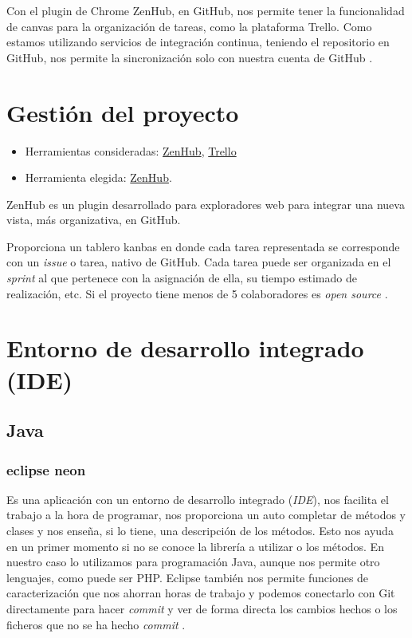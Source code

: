 Con el plugin de Chrome ZenHub, en GitHub, nos permite tener la funcionalidad de canvas para la organización de tareas, como la plataforma Trello. Como estamos utilizando servicios de integración continua, teniendo el repositorio en GitHub, nos permite la sincronización solo con nuestra cuenta de GitHub \cite{web:github}.

\section{Gestión del proyecto}\label{gestion-del-proyecto}

\begin{itemize}
	\tightlist
	\item
	Herramientas consideradas: \href{https://www.zenhub.com/}{ZenHub},
	\href{https://trello.com/}{Trello}
	\item
	Herramienta elegida: \href{https://www.zenhub.com/}{ZenHub}.
\end{itemize}

ZenHub es un plugin desarrollado para exploradores web para integrar una nueva vista, más organizativa, en GitHub. 

Proporciona un tablero kanbas en donde cada tarea representada se corresponde con un \emph{issue} o tarea, nativo de GitHub. Cada tarea puede ser organizada en el \emph{sprint} al que pertenece con la asignación de ella, su tiempo estimado de realización, etc. Si el proyecto tiene menos de 5 colaboradores es \emph{open source} \cite{web:zenhub}.


\section{Entorno de desarrollo integrado
	(IDE)}\label{entorno-de-desarrollo-integrado-ide}

\subsection{Java}\label{java}

\subsubsection{eclipse neon}\label{eclipse}
Es una aplicación con un entorno de desarrollo integrado (\emph{IDE}), nos facilita el trabajo a la hora de programar, nos proporciona un auto completar de métodos y clases y nos enseña, si lo tiene, una descripción de los métodos. Esto nos ayuda en un primer momento si no se conoce la librería a utilizar o los métodos. En nuestro caso lo utilizamos para programación Java, aunque nos permite otro lenguajes, como puede ser PHP.
Eclipse también nos permite funciones de caracterización que nos ahorran horas de trabajo y podemos conectarlo con Git directamente para hacer \emph{commit} y ver de forma directa los cambios hechos o los ficheros que no se ha hecho \emph{commit} \cite{web:eclipse}.

